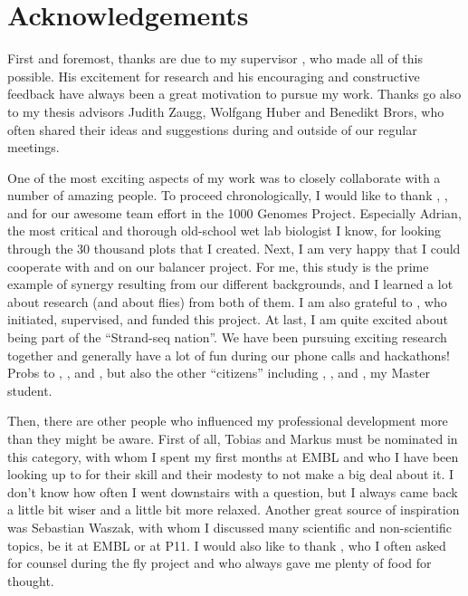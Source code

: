 \cleardoublepage
{}
\chapter*{Acknowledgements}


First and foremost, thanks are due to my supervisor \jan, who made all of this
possible. His excitement for research and his encouraging and constructive
feedback have always been a great motivation to pursue my work. Thanks go also
to my thesis advisors Judith Zaugg, Wolfgang Huber and Benedikt Brors, who often
shared their ideas and suggestions during and outside of our regular meetings.

One of the most exciting aspects of my work was to closely collaborate with a
number of amazing people. To proceed chronologically, I would like to thank
\tobias, \markus, \andreas and \adrian for our awesome team effort in the
1000 Genomes Project. Especially Adrian, the most critical and thorough
old-school wet lab biologist I know, for looking through the 30 thousand plots
that I created. Next, I am very happy that I could cooperate with \yad and \alek
on our balancer project. For me, this study is the prime example of synergy
resulting from our different backgrounds, and I learned a lot about research
(and about flies) from both of them. I am also grateful to \eileen, who
initiated, supervised, and funded this project. At last, I am quite excited
about being part of the ``Strand-seq nation''. We have been pursuing exciting
research together and generally have a lot of fun during our phone calls and
hackathons! Probs to \ashley, \marschall, \david and \maryam, but also the
other ``citizens'' including \karen, \hyobin, and \venla, my Master student.

Then, there are other people who influenced my professional development more
than they might be aware. First of all, Tobias and Markus must be nominated in
this category, with whom I spent my first months at EMBL and who I have been
looking up to for their skill and their modesty to not make a big deal about it.
I don't know how often I went downstairs with a question, but I always came back
a little bit wiser and a little bit more relaxed. Another great source of
inspiration was Sebastian Waszak, with whom I discussed many scientific and
non-scientific topics, be it at EMBL or at P11. I would also like to thank
\garfield, who I often asked for counsel during the fly project and who always
gave me plenty of food for thought.

